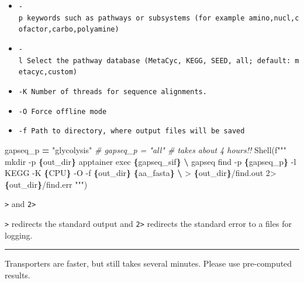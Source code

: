 \documentclass[
]{book}
\newenvironment{Shaded}{\begin{snugshade}}{\end{snugshade}}
\newcommand{\CommentTok}[1]{\textcolor[rgb]{0.56,0.35,0.01}{\textit{#1}}}
\newcommand{\NormalTok}[1]{#1}
\newcommand{\OperatorTok}[1]{\textcolor[rgb]{0.81,0.36,0.00}{\textbf{#1}}}
\newcommand{\SpecialCharTok}[1]{\textcolor[rgb]{0.81,0.36,0.00}{\textbf{#1}}}
\newcommand{\SpecialStringTok}[1]{\textcolor[rgb]{0.31,0.60,0.02}{#1}}
\newcommand{\StringTok}[1]{\textcolor[rgb]{0.31,0.60,0.02}{#1}}
\providecommand{\tightlist}{%
  \setlength{\itemsep}{0pt}\setlength{\parskip}{0pt}}
\begin{document}
\begin{itemize}
\tightlist
\item
  \texttt{-p\ keywords\ such\ as\ pathways\ or\ subsystems\ (for\ example\ amino,nucl,cofactor,carbo,polyamine)}
\item
  \texttt{-l\ Select\ the\ pathway\ database\ (MetaCyc,\ KEGG,\ SEED,\ all;\ default:\ metacyc,custom)}
\item
  \texttt{-K\ Number\ of\ threads\ for\ sequence\ alignments.}
\item
  \texttt{-O\ Force\ offline\ mode}
\item
  \texttt{-f\ Path\ to\ directory,\ where\ output\ files\ will\ be\ saved}
\end{itemize}

\begin{Shaded}
\begin{Highlighting}[numbers=left,,]
\NormalTok{gapseq\_p }\OperatorTok{=} \StringTok{"glycolysis"}
\CommentTok{\# gapseq\_p = "all" \# takes about 4 hours!!}
\NormalTok{Shell(}\SpecialStringTok{f"""}
\SpecialStringTok{mkdir {-}p }\SpecialCharTok{\{}\NormalTok{out\_dir}\SpecialCharTok{\}}
\SpecialStringTok{apptainer exec }\SpecialCharTok{\{}\NormalTok{gapseq\_sif}\SpecialCharTok{\}}\SpecialStringTok{ }\OperatorTok{\textbackslash{}}
\SpecialStringTok{    gapseq find {-}p }\SpecialCharTok{\{}\NormalTok{gapseq\_p}\SpecialCharTok{\}}\SpecialStringTok{ {-}l KEGG {-}K }\SpecialCharTok{\{}\NormalTok{CPU}\SpecialCharTok{\}}\SpecialStringTok{ {-}O {-}f }\SpecialCharTok{\{}\NormalTok{out\_dir}\SpecialCharTok{\}}\SpecialStringTok{ }\SpecialCharTok{\{}\NormalTok{aa\_fasta}\SpecialCharTok{\}}\SpecialStringTok{ }\OperatorTok{\textbackslash{}}
\SpecialStringTok{        \textgreater{} }\SpecialCharTok{\{}\NormalTok{out\_dir}\SpecialCharTok{\}}\SpecialStringTok{/find.out 2\textgreater{} }\SpecialCharTok{\{}\NormalTok{out\_dir}\SpecialCharTok{\}}\SpecialStringTok{/find.err}
\SpecialStringTok{"""}\NormalTok{)}
\end{Highlighting}
\end{Shaded}

\texttt{\textgreater{}} and \texttt{2\textgreater{}}

\texttt{\textgreater{}} redirects the standard output and \texttt{2\textgreater{}} redirects the standard error to a files for logging.

\begin{center}\rule{0.5\linewidth}{0.5pt}\end{center}

Transporters are faster, but still takes several minutes. Please use pre-computed results.
\end{document}
